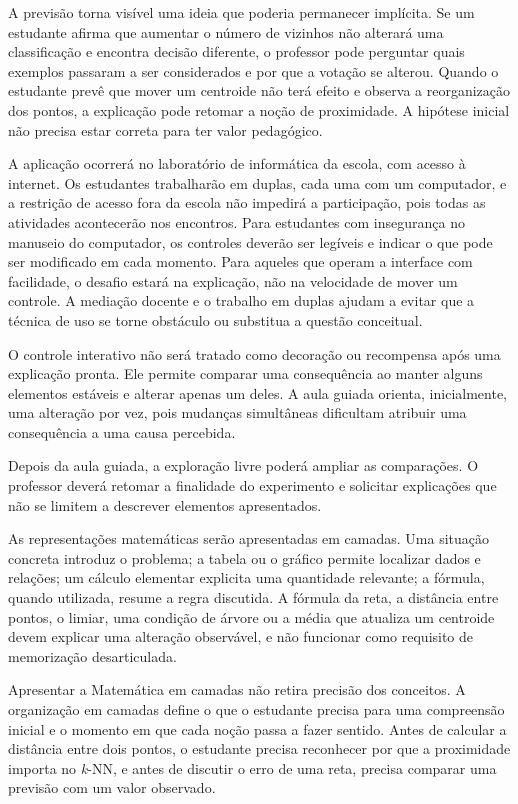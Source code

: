 A previsão torna visível uma ideia que poderia permanecer implícita. Se um estudante afirma que aumentar o número de vizinhos não alterará uma classificação e encontra decisão diferente, o professor pode perguntar quais exemplos passaram a ser considerados e por que a votação se alterou. Quando o estudante prevê que mover um centroide não terá efeito e observa a reorganização dos pontos, a explicação pode retomar a noção de proximidade. A hipótese inicial não precisa estar correta para ter valor pedagógico.

A aplicação ocorrerá no laboratório de informática da escola, com acesso à internet. Os estudantes trabalharão em duplas, cada uma com um computador, e a restrição de acesso fora da escola não impedirá a participação, pois todas as atividades acontecerão nos encontros. Para estudantes com insegurança no manuseio do computador, os controles deverão ser legíveis e indicar o que pode ser modificado em cada momento. Para aqueles que operam a interface com facilidade, o desafio estará na explicação, não na velocidade de mover um controle. A mediação docente e o trabalho em duplas ajudam a evitar que a técnica de uso se torne obstáculo ou substitua a questão conceitual.

O controle interativo não será tratado como decoração ou recompensa após uma explicação pronta. Ele permite comparar uma consequência ao manter alguns elementos estáveis e alterar apenas um deles. A aula guiada orienta, inicialmente, uma alteração por vez, pois mudanças simultâneas dificultam atribuir uma consequência a uma causa percebida.

Depois da aula guiada, a exploração livre poderá ampliar as comparações. O professor deverá retomar a finalidade do experimento e solicitar explicações que não se limitem a descrever elementos apresentados.

As representações matemáticas serão apresentadas em camadas. Uma situação concreta introduz o problema; a tabela ou o gráfico permite localizar dados e relações; um cálculo elementar explicita uma quantidade relevante; a fórmula, quando utilizada, resume a regra discutida. A fórmula da reta, a distância entre pontos, o limiar, uma condição de árvore ou a média que atualiza um centroide devem explicar uma alteração observável, e não funcionar como requisito de memorização desarticulada.

Apresentar a Matemática em camadas não retira precisão dos conceitos. A organização em camadas define o que o estudante precisa para uma compreensão inicial e o momento em que cada noção passa a fazer sentido. Antes de calcular a distância entre dois pontos, o estudante precisa reconhecer por que a proximidade importa no \textit{k}-NN, e antes de discutir o erro de uma reta, precisa comparar uma previsão com um valor observado.

